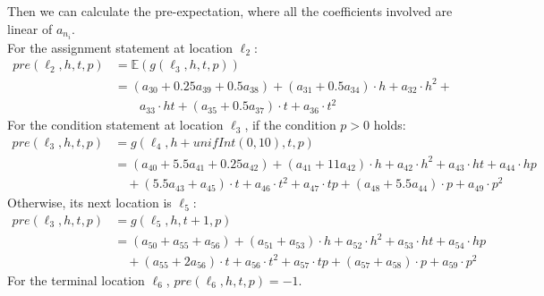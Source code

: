 \documentclass[runningheads]{llncs}
\begin{document}
Then we can calculate the pre-expectation, where all the coefficients involved are linear of $a_{n_i}$.\\ For the assignment statement at location $\ell_2$:
\begin{align*}
pre(\ell_2,h,t,p)&=\mathbb{E}(g(\ell_3,h,t,p)) \\
&= (a_{30}+0.25a_{39}+0.5a_{38})+(a_{31}+0.5a_{34})\cdot h+a_{32}\cdot h^{2}+\\&\qquad a_{33}\cdot ht+(a_{35}+0.5a_{37})\cdot t+a_{36}\cdot t^{2}  
\end{align*}
For the condition statement at location $\ell_3$, if the condition $p>0$ holds:
\begin{align*}
pre(\!\ell_3,h,t,p\!)&\!=\!g(\ell_4,h+unifInt(0,10),t,p) \\
&\!=\!(a_{40}\!+\!5.5a_{41}\!+\!0.25a_{42})\!+\!(a_{41}\!+\!11a_{42})\!\cdot\! h\!+\!a_{42}\!\cdot\! h^{2}\!+\!a_{43}\!\cdot\!ht\!+\!a_{44}\!\cdot\! hp\\&\quad +(5.5a_{43}\!+\!a_{45})\!\cdot\! t\!+\! a_{46}\!\cdot\! t^{2}\!+\!a_{47}\!\cdot\! tp +(a_{48}\!+\!5.5a_{44})\!\cdot\! p\!+\!a_{49}\!\cdot\! p^{2} 
\end{align*}
Otherwise, its next location is $\ell_5$:
\begin{align*}
pre(\ell_3,h,t,p)&=g(\ell_5,h,t+1,p) \\
&=(a_{50}\!+\!a_{55}\!+\!a_{56})+(a_{51}\!+\!a_{53})\cdot h +a_{52}\cdot h^{2}+a_{53}\cdot ht+a_{54}\cdot hp\\&\quad +(a_{55}+2a_{56})\cdot t+a_{56}\cdot t^{2}+a_{57}\cdot tp+(a_{57}+a_{58})\cdot p+a_{59}\cdot p^{2}
\end{align*}
For the terminal location $\ell_6$, $pre(\ell_6,h,t,p)=-1$.
\end{document}
